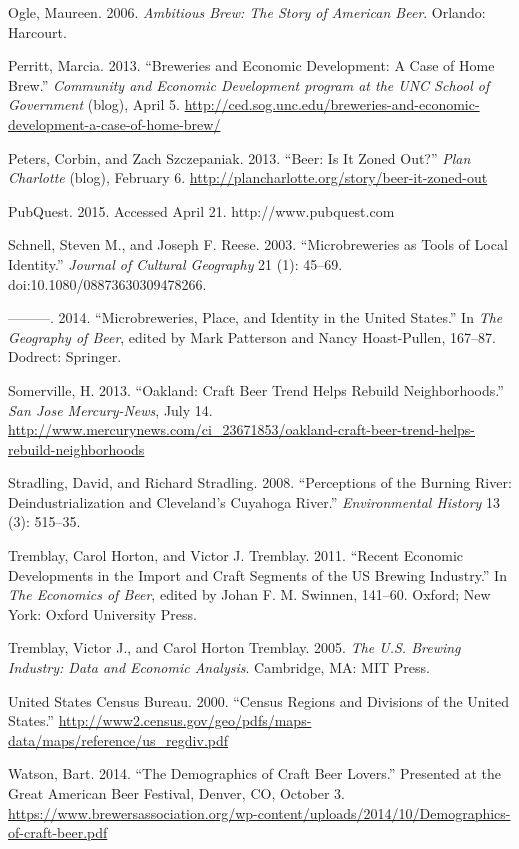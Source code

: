 \documentclass[]{article}
\begin{document}
Ogle, Maureen. 2006. \emph{Ambitious Brew: The Story of American Beer}.
Orlando: Harcourt.

Perritt, Marcia. 2013. ``Breweries and Economic Development: A Case of
Home Brew.'' \emph{Community and Economic Development program at the UNC
School of Government} (blog), April 5.
\url{http://ced.sog.unc.edu/breweries-and-economic-development-a-case-of-home-brew/}

Peters, Corbin, and Zach Szczepaniak. 2013. ``Beer: Is It Zoned Out?''
\emph{Plan Charlotte} (blog), February 6.
\url{http://plancharlotte.org/story/beer-it-zoned-out}

PubQuest. 2015. Accessed April 21. http://www.pubquest.com

Schnell, Steven M., and Joseph F. Reese. 2003. ``Microbreweries as Tools
of Local Identity.'' \emph{Journal of Cultural Geography} 21 (1):
45--69. doi:10.1080/08873630309478266.

---------. 2014. ``Microbreweries, Place, and Identity in the United
States.'' In \emph{The Geography of Beer}, edited by Mark Patterson and
Nancy Hoast-Pullen, 167--87. Dodrect: Springer.

Somerville, H. 2013. ``Oakland: Craft Beer Trend Helps Rebuild
Neighborhoods.'' \emph{San Jose Mercury-News}, July 14.
\url{http://www.mercurynews.com/ci\_23671853/oakland-craft-beer-trend-helps-rebuild-neighborhoods}

Stradling, David, and Richard Stradling. 2008. ``Perceptions of the
Burning River: Deindustrialization and Cleveland's Cuyahoga River.''
\emph{Environmental History} 13 (3): 515--35.

Tremblay, Carol Horton, and Victor J. Tremblay. 2011. ``Recent Economic
Developments in the Import and Craft Segments of the US Brewing
Industry.'' In \emph{The Economics of Beer}, edited by Johan F. M.
Swinnen, 141--60. Oxford; New York: Oxford University Press.

Tremblay, Victor J., and Carol Horton Tremblay. 2005. \emph{The U.S.
Brewing Industry: Data and Economic Analysis}. Cambridge, MA: MIT Press.

United States Census Bureau. 2000. ``Census Regions and Divisions of the
United States.''
\url{http://www2.census.gov/geo/pdfs/maps-data/maps/reference/us\_regdiv.pdf}

Watson, Bart. 2014. ``The Demographics of Craft Beer Lovers.'' Presented
at the Great American Beer Festival, Denver, CO, October 3.
\url{https://www.brewersassociation.org/wp-content/uploads/2014/10/Demographics-of-craft-beer.pdf}
\end{document}
